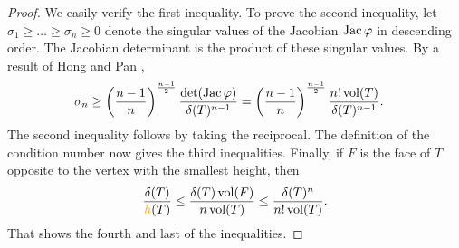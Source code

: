 \documentclass[10pt,letterpaper]{article}
\begin{document}
\begin{proof}
%     
    We easily verify the first inequality. To prove the second inequality, let $\sigma_1 \geq \dots \geq \sigma_n \geq 0$ denote the singular values of the Jacobian $\operatorname{{\rm Jac}}\varphi$ in descending order.
    The Jacobian determinant is the product of these singular values. 
    By a result of Hong and Pan \cite{hong1992lower},
    \begin{align*}
        \sigma_{n}
        &\geq 
        \left( \frac{n-1}{n} \right)^{\frac{n-1}{2}}
        \frac{ \det(\operatorname{{\rm Jac}}\varphi) }{ {\delta}(T)^{n-1} }
        = 
        \left( \frac{n-1}{n} \right)^{\frac{n-1}{2}}
        \frac{ n! \operatorname{vol}(T) }{ {\delta}(T)^{n-1} }
        .
    \end{align*}
    The second inequality follows by taking the reciprocal. 
    The definition of the condition number now gives the third inequalities. 
    Finally, 
    if $F$ is the face of $T$ opposite to the vertex with the smallest height, then 
    \begin{align*}
        \frac{ \diam(T) }{ \height(T) }
        \leq 
        \frac{ \diam(T) \vol(F) }{ n \vol(T) }
        \leq 
        \frac{ \diam(T)^{n} }{ n! \vol(T) }
        .
    \end{align*}
    That shows the fourth and last of the inequalities. 
\end{proof}
\end{document}
